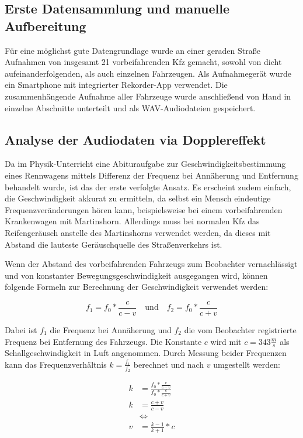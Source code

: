 \subsection{Erste Datensammlung und manuelle Aufbereitung}
Für eine möglichst gute Datengrundlage wurde an einer geraden Straße Aufnahmen von insgesamt 21 vorbeifahrenden Kfz gemacht, sowohl von dicht aufeinanderfolgenden, als auch einzelnen Fahrzeugen. Als Aufnahmegerät wurde ein Smartphone mit integrierter Rekorder-App verwendet. Die zusammenhängende Aufnahme aller Fahrzeuge wurde anschließend von Hand in einzelne Abschnitte unterteilt und als WAV-Audiodateien gespeichert.  %

\subsection{Analyse der Audiodaten via Dopplereffekt}
Da im Phy\-sik-Unter\-richt eine Abituraufgabe zur Geschwindigkeitsbestimmung eines Rennwagens mittels Differenz der Frequenz bei Annäherung und Entfernung behandelt wurde, ist das der erste verfolgte Ansatz. Es erscheint zudem einfach, die Geschwindigkeit akkurat zu ermitteln, da selbst ein Mensch eindeutige Frequenzveränderungen hören kann, beispielsweise bei einem vorbeifahrenden Krankenwagen mit Martinshorn. Allerdings muss bei normalen Kfz das Reifengeräusch anstelle des Martinshorns verwendet werden, da dieses mit Abstand die lauteste Geräuschquelle des Straßenverkehrs ist.

Wenn der Abstand des vorbeifahrenden Fahrzeugs zum Beobachter vernachlässigt und von konstanter Bewegungsgeschwindigkeit ausgegangen wird, können folgende Formeln zur Berechnung der Geschwindigkeit verwendet werden:

\[
    f_{1} = f_{0} * \frac{c}{c - v}
    \quad\text{und}\quad
    f_{2} = f_{0} * \frac{c}{c + v}
\]

Dabei ist \(f_{1}\) die Frequenz bei Annäherung und \(f_{2}\) die vom Beobachter registrierte Frequenz bei Entfernung des Fahrzeugs. Die Konstante \(c\) wird mit \(c = 343\frac{m}{s}\) als Schallgeschwindigkeit in Luft angenommen. Durch Messung beider Frequenzen kann das Frequenzverhältnis \(k = \frac{f_{1}}{f_{2}}\) berechnet und nach \(v\) umgestellt werden:

\begin{equation*}
    \begin{split}
        k & = \frac{f_{0} * \frac{c}{c - v}}{f_{0} * \frac{c}{c + v}} \\
        k & = \frac{c + v}{c - v} \\
        & \Leftrightarrow \\
        v & = \frac{k - 1}{k + 1} * c
    \end{split}
\end{equation*}

